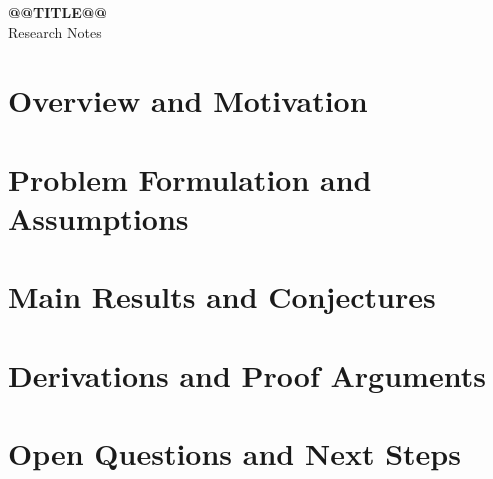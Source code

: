 \documentclass[11pt,a4paper]{article}
\theoremstyle{plain}
\theoremstyle{definition}
\theoremstyle{remark}
\begin{document}
\begin{center}
  {\Large\bfseries @@TITLE@@}\\[4pt]
  {\normalsize Research Notes}
\end{center}

\section{Overview and Motivation}

\section{Problem Formulation and Assumptions}

\section{Main Results and Conjectures}

\section{Derivations and Proof Arguments}

\section{Open Questions and Next Steps}

% 
\end{document}
